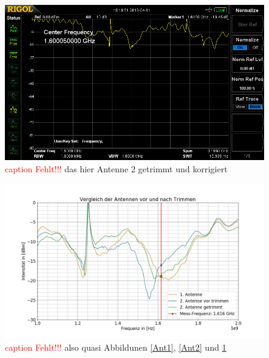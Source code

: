 \documentclass[titlepage,11pt,a4paper,ngerman]{article}
\begin{document}

\begin{figure}[ht]
	\includegraphics[scale=0.075]{Bilder/anttrimm2.jpg}
	\centering
	\caption{\textcolor{red}{caption Fehlt!!!} das hier Antenne 2 getrimmt und korrigiert}
	\label{Ant2-getrimmt}
\end{figure}

\begin{figure}[ht]
	\includegraphics[scale=0.4]{Bilder/Antennentrimmen}
	\centering
	\caption{\textcolor{red}{caption Fehlt!!!} also quasi Abbildunen \ref{Ant1}, \ref{Ant2} und \ref{Ant2-getrimmt}}
	\label{Vergleich}
\end{figure}
\end{document}
